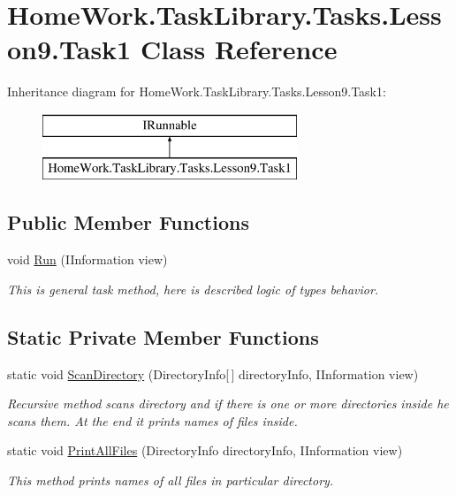 \hypertarget{class_home_work_1_1_task_library_1_1_tasks_1_1_lesson9_1_1_task1}{}\section{Home\+Work.\+Task\+Library.\+Tasks.\+Lesson9.\+Task1 Class Reference}
\label{class_home_work_1_1_task_library_1_1_tasks_1_1_lesson9_1_1_task1}
Inheritance diagram for Home\+Work.\+Task\+Library.\+Tasks.\+Lesson9.\+Task1\+:\begin{figure}[H]
\begin{center}
\leavevmode
\includegraphics[height=2.000000cm]{class_home_work_1_1_task_library_1_1_tasks_1_1_lesson9_1_1_task1}
\end{center}
\end{figure}
\subsection*{Public Member Functions}
\begin{DoxyCompactItemize}
\item 
void \mbox{\hyperlink{class_home_work_1_1_task_library_1_1_tasks_1_1_lesson9_1_1_task1_abf309774c050a656db5396e860d16ab2}{Run}} (I\+Information view)
\begin{DoxyCompactList}\small\item\em This is general task method, here is described logic of types behavior. \end{DoxyCompactList}\end{DoxyCompactItemize}
\subsection*{Static Private Member Functions}
\begin{DoxyCompactItemize}
\item 
static void \mbox{\hyperlink{class_home_work_1_1_task_library_1_1_tasks_1_1_lesson9_1_1_task1_afc82c594307b1f65309401a397d1ec1f}{Scan\+Directory}} (Directory\+Info\mbox{[}$\,$\mbox{]} directory\+Info, I\+Information view)
\begin{DoxyCompactList}\small\item\em Recursive method scans directory and if there is one or more directories inside he scans them. At the end it prints names of files inside. \end{DoxyCompactList}\item 
static void \mbox{\hyperlink{class_home_work_1_1_task_library_1_1_tasks_1_1_lesson9_1_1_task1_abc4526395f5d9e8c723479d0bb4b2783}{Print\+All\+Files}} (Directory\+Info directory\+Info, I\+Information view)
\begin{DoxyCompactList}\small\item\em This method prints names of all files in particular directory. \end{DoxyCompactList}\end{DoxyCompactItemize}


